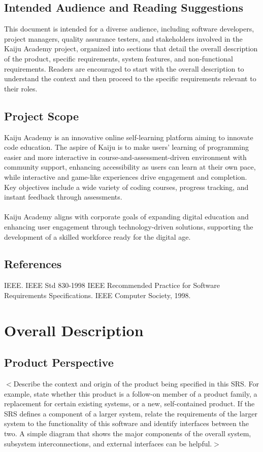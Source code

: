 \documentclass[a4paper, 11pt]{scrreprt}
\begin{document}
\section{Intended Audience and Reading Suggestions}
This document is intended for a diverse audience, including software developers, project managers, quality assurance testers, and stakeholders involved in the Kaiju Academy project, organized into sections that detail the overall description of the product, specific requirements, system features, and non-functional requirements. Readers are encouraged to start with the overall description to understand the context and then proceed to the specific requirements relevant to their roles.

\section{Project Scope}
Kaiju Academy is an innovative online self-learning platform aiming to innovate code education. The aspire of Kaiju is to make users' learning of programming easier and more interactive in course-and-assessment-driven environment with community support, enhancing accessibility as users can learn at their own pace, while interactive and game-like experiences drive engagement and completion. Key objectives include a wide variety of coding courses, progress tracking, and instant feedback through assessments.\\\\
Kaiju Academy aligns with corporate goals of expanding digital education and enhancing user engagement through technology-driven solutions, supporting the development of a skilled workforce ready for the digital age.


\section{References}
IEEE. IEEE Std 830-1998 IEEE Recommended Practice for Software Requirements Specifications. IEEE Computer Society, 1998.


\chapter{Overall Description}

\section{Product Perspective}
$<$Describe the context and origin of the product being specified in this SRS.  
For example, state whether this product is a follow-on member of a product 
family, a replacement for certain existing systems, or a new, self-contained 
product. If the SRS defines a component of a larger system, relate the 
requirements of the larger system to the functionality of this software and 
identify interfaces between the two. A simple diagram that shows the major 
components of the overall system, subsystem interconnections, and external 
interfaces can be helpful.$>$
\end{document}
